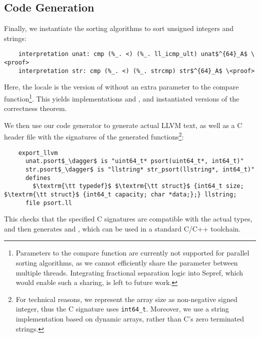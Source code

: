 \documentclass[sn-mathphys,Numbered]{sn-jnl}
\theoremstyle{thmstyleone}%
\theoremstyle{definition}%
\theoremstyle{thmstylethree}%
\begin{document}
  \subsection{Code Generation}
  Finally, we instantiate the sorting algorithms to sort unsigned integers and strings:
  \begin{lstlisting}
    interpretation unat: cmp (%_. <) (%_. ll_icmp_ult) unat$^{64}_A$ \<proof>
    interpretation str: cmp (%_. <) (%_. strcmp) str$^{64}_A$ \<proof>
  \end{lstlisting}
  Here, the locale  is the version of  without an extra parameter to the compare function\footnote{
    Parameters to the compare function are currently not supported for parallel sorting algorithms, as we cannot
    efficiently share the parameter between multiple threads. Integrating fractional separation logic into Sepref,
    which would enable such a sharing, is left to future work. }.
  This yields implementations  and , and instantiated versions of the correctness theorem.

  We then use our code generator to generate actual LLVM text, as well as a C header file with the
  signatures of the generated functions\footnote{
    For technical reasons, we represent the array size as non-negative signed integer, thus the C signature uses \lstinline[language=C]{int64_t}.
    Moreover, we use a string implementation based on dynamic arrays, rather than C's zero terminated strings.
  }:
  \begin{lstlisting}
    export_llvm
      unat.psort$_\dagger$ is "uint64_t* psort(uint64_t*, int64_t)"
      str.psort$_\dagger$ is "llstring* str_psort(llstring*, int64_t)"
      defines
        $\textrm{\tt typedef}$ $\textrm{\tt struct}$ {int64_t size; $\textrm{\tt struct}$ {int64_t capacity; char *data;};} llstring;
      file psort.ll
  \end{lstlisting}
  This checks that the specified C signatures are compatible with the actual types, and then
  generates  and , which can be used in a standard C/C++ toolchain.
\end{document}
